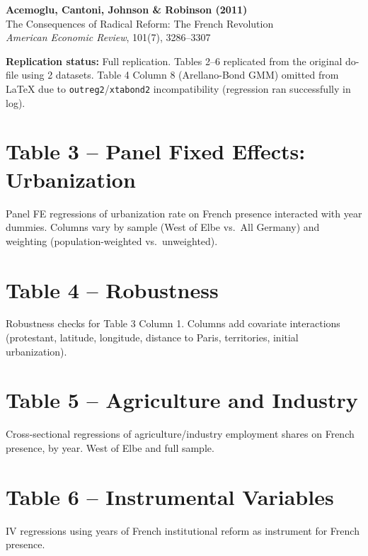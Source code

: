 \documentclass[12pt]{article}
\begin{document}
\begin{center}
{\Large\bfseries Acemoglu, Cantoni, Johnson \& Robinson (2011)}\\
{\large The Consequences of Radical Reform: The French Revolution}\\
\vspace{0.5em}
{\normalsize \textit{American Economic Review}, 101(7), 3286--3307}
\end{center}

\vspace{1em}
\noindent\textbf{Replication status:} Full replication.
Tables 2--6 replicated from the original do-file using 2 datasets.
Table 4 Column 8 (Arellano-Bond GMM) omitted from LaTeX due to
\texttt{outreg2}/\texttt{xtabond2} incompatibility (regression ran successfully in log).

\tableofcontents

\clearpage
\section{Table 3 -- Panel Fixed Effects: Urbanization}

Panel FE regressions of urbanization rate on French presence interacted
with year dummies. Columns vary by sample (West of Elbe vs.\ All Germany)
and weighting (population-weighted vs.\ unweighted).

\vspace{1em}


\clearpage
\section{Table 4 -- Robustness}

Robustness checks for Table 3 Column 1. Columns add covariate interactions
(protestant, latitude, longitude, distance to Paris, territories, initial urbanization).

\vspace{1em}


\clearpage
\section{Table 5 -- Agriculture and Industry}

Cross-sectional regressions of agriculture/industry employment shares
on French presence, by year. West of Elbe and full sample.

\vspace{1em}


\clearpage
\section{Table 6 -- Instrumental Variables}

IV regressions using years of French institutional reform as instrument
for French presence.

\vspace{1em}

\end{document}
